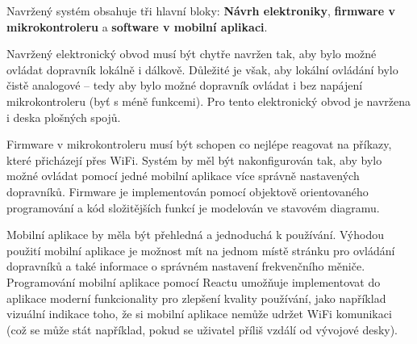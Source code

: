 Navržený systém obsahuje tři hlavní bloky: \textbf{Návrh elektroniky}, \textbf{firmware v mik\-ro\-kon\-tro\-le\-ru} a \textbf{software v mobilní aplikaci}.

Navržený elektronický obvod musí být chytře navržen tak, aby bylo možné ovládat dopravník lokálně i dálkově. Důležité je však, aby lokální ovládání bylo čistě analogové – tedy aby bylo možné dopravník ovládat i bez napájení mikrokontroleru (byť s méně funkcemi). Pro tento elektronický obvod je navržena i deska plošných spojů.

Firmware v mikrokontroleru musí být schopen co nejlépe reagovat na příkazy, které přicházejí přes WiFi. Systém by měl být nakonfigurován tak, aby bylo možné ovládat pomocí jedné mobilní aplikace více správně nastavených dopravníků. Firmware je implementován pomocí objektově orientovaného programování a kód složitějších funkcí je modelován ve stavovém diagramu.

Mobilní aplikace by měla být přehledná a jednoduchá k používání. Výhodou použití mobilní aplikace je možnost mít na jednom místě stránku pro ovládání dopravníků a také informace o správném nastavení frekvenčního měniče. Programování mobilní aplikace pomocí Reactu umožňuje implementovat do aplikace moderní funkcionality pro zlepšení kvality používání, jako například vizuální indikace toho, že si mobilní aplikace nemůže udržet WiFi komunikaci (což se může stát například, pokud se uživatel příliš vzdálí od vývojové desky).

%
%
